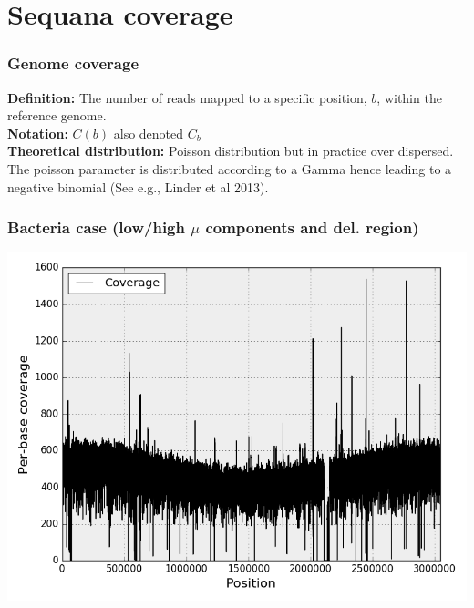 \documentclass{beamer}
\begin{document}
 
\section{Sequana coverage}


\begin{frame}
\frametitle{Genome coverage}

\textbf{Definition:} The number of reads mapped to a specific position, $b$, 
within the reference genome. \\
\vspace{1em}
\textbf{Notation:} $ C(b)$ also denoted $C_b$\\
\vspace{1em}
\textbf{Theoretical distribution:} Poisson distribution but in practice over 
dispersed. The poisson parameter is distributed according to a Gamma hence 
leading to a negative binomial (See e.g., Linder et al 2013).
\end{frame}


\begin{frame}
\frametitle{\small Bacteria case (low/high $\mu$ components and del. region)}
\begin{center}
\includegraphics[height=0.9\textheight, 
width=1\textwidth]{images/coverage_bacteria.png}
\end{center}
\end{frame}
\end{document}
